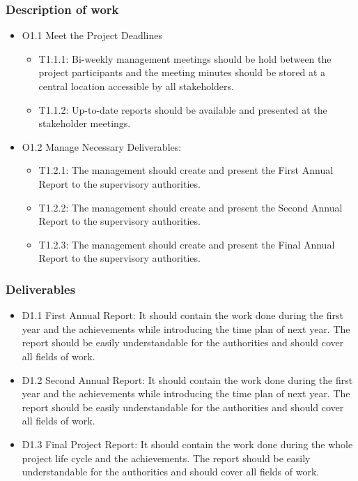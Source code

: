 \subsubsection{Description of work}
\begin{itemize}
	\item O1.1 Meet the Project Deadlines
	\begin{itemize}
		\item T1.1.1: Bi-weekly management meetings should be hold between the project participants and the meeting minutes should be stored at a central location accessible by all stakeholders.
		\item T1.1.2: Up-to-date reports should be available and presented at the stakeholder meetings. 
	\end{itemize}
	\item O1.2 Manage Necessary Deliverables:
	\begin{itemize}
		\item T1.2.1: The management should create and present the First Annual Report to the supervisory authorities.   
		\item T1.2.2: The management should create and present the Second Annual Report to the supervisory authorities.
		\item T1.2.3: The management should create and present the Final Annual Report to the supervisory authorities.
	\end{itemize} 
\end{itemize}

\subsubsection{Deliverables}

\begin{itemize}
	\item D1.1 First Annual Report: It should contain the work done during the first year and the achievements while introducing the time plan of next year. The report should be easily understandable for the authorities and should cover all fields of work.
	\item D1.2 Second Annual Report: It should contain the work done during the first year and the achievements while introducing the time plan of next year. The report should be easily understandable for the authorities and should cover all fields of work.  
	\item D1.3 Final Project Report:  It should contain the work done during the whole project life cycle and the achievements. The report should be easily understandable for the authorities and should cover all fields of work.  
\end{itemize}